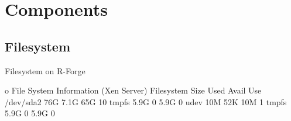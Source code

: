 \documentclass[a4paper]{article}
\begin{document}
\section{Components}
\label{sec:registration}

\subsection{Filesystem}

Filesystem on R-Forge 

o File System Information (Xen Server)
		Filesystem            Size  Used Avail Use%
		/dev/sda2              76G  7.1G   65G  10%
		tmpfs                 5.9G     0  5.9G   0%
		udev                   10M   52K   10M   1%
		tmpfs                 5.9G     0  5.9G   0%
\end{document}
